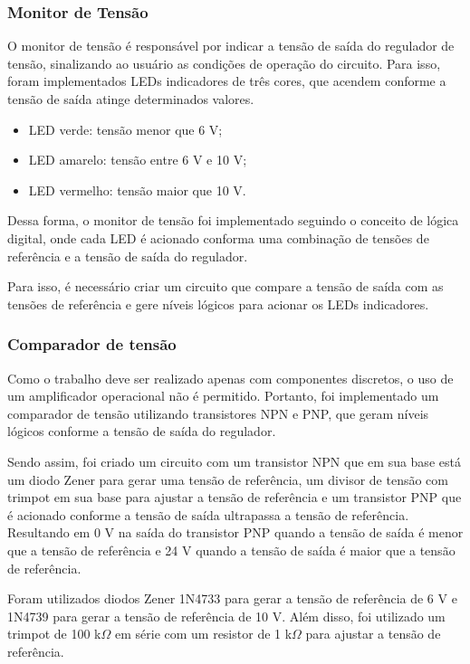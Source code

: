 \subsubsection{Monitor de Tensão}

O monitor de tensão é responsável por indicar a tensão de saída do regulador de tensão, sinalizando ao usuário as condições de operação do circuito. Para isso, foram implementados LEDs indicadores de três cores, que acendem conforme a tensão de saída atinge determinados valores.

\begin{itemize}
    \item LED verde: tensão menor que 6 V;
    \item LED amarelo: tensão entre 6 V e 10 V;
    \item LED vermelho: tensão maior que 10 V.
\end{itemize}

Dessa forma, o monitor de tensão foi implementado seguindo o conceito de lógica digital, onde cada LED é acionado conforma uma combinação de tensões de referência e a tensão de saída do regulador.

Para isso, é necessário criar um circuito que compare a tensão de saída com as tensões de referência e gere níveis lógicos para acionar os LEDs indicadores.

\subsubsection*{Comparador de tensão}

Como o trabalho deve ser realizado apenas com componentes discretos, o uso de um amplificador operacional não é permitido. Portanto, foi implementado um comparador de tensão utilizando transistores NPN e PNP, que geram níveis lógicos conforme a tensão de saída do regulador.

Sendo assim, foi criado um circuito com um transistor NPN que em sua base está um diodo Zener para gerar uma tensão de referência, um divisor de tensão com trimpot em sua base para ajustar a tensão de referência e um transistor PNP que é acionado conforme a tensão de saída ultrapassa a tensão de referência. Resultando em 0 V na saída do transistor PNP quando a tensão de saída é menor que a tensão de referência e 24 V quando a tensão de saída é maior que a tensão de referência.

Foram utilizados diodos Zener 1N4733 para gerar a tensão de referência de 6 V e 1N4739 para gerar a tensão de referência de 10 V. Além disso, foi utilizado um trimpot de 100 k\(\Omega\) em série com um resistor de 1 k\(\Omega\) para ajustar a tensão de referência.

